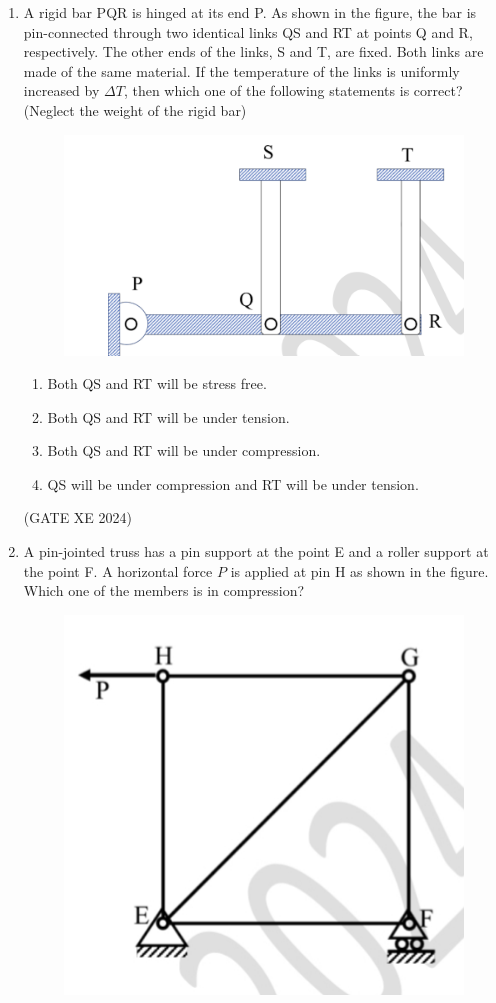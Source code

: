 \documentclass[12pt]{article}
\begin{document}
\begin{enumerate}
(GATE XE 2024)

\item A rigid bar PQR is hinged at its end P. As shown in the figure, the bar is pin-connected through two identical links QS and RT at points Q and R, respectively. The other ends of the links, S and T, are fixed. Both links are made of the same material. If the temperature of the links is uniformly increased by $\Delta T$, then which one of the following statements is correct? (Neglect the weight of the rigid bar)

\begin{figure}[H]
    \centering
    \includegraphics[width=0.5\columnwidth]{figs/ass5_d_q76.png}
    \caption{}
    \label{fig:placeholder}
\end{figure}

\begin{enumerate}
\item Both QS and RT will be stress free.
\item Both QS and RT will be under tension.
\item Both QS and RT will be under compression.
\item QS will be under compression and RT will be under tension.
\end{enumerate}

(GATE XE 2024)

\item A pin-jointed truss has a pin support at the point E and a roller support at the point F. A horizontal force $P$ is applied at pin H as shown in the figure. Which one of the members is in compression?

\begin{figure}[H]
    \centering
    \includegraphics[width=0.5\columnwidth]{figs/IMG_20250823_190304.jpg}
    \caption{}
    \label{fig:placeholder}
\end{figure}


\end{enumerate}
\end{document}
